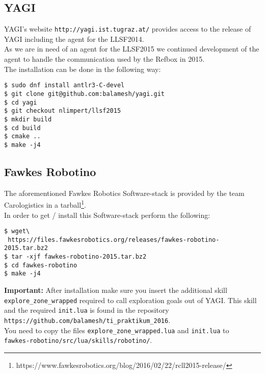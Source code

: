 \documentclass[oribibl]{llncs}
\begin{document}
\subsection{YAGI}
YAGI's website \texttt{http://yagi.ist.tugraz.at/} provides access to the release of YAGI including the agent for the LLSF2014.\\
As we are in need of an agent for the LLSF2015 we continued development of the agent to handle the communication used by the Refbox in 2015.\\
The installation can be done in the following way:
\begin{lstlisting}[frame=single]
$ sudo dnf install antlr3-C-devel
$ git clone git@github.com:balamesh/yagi.git
$ cd yagi
$ git checkout nlimpert/llsf2015
$ mkdir build
$ cd build
$ cmake ..
$ make -j4
\end{lstlisting}

\subsection{Fawkes Robotino}
The aforementioned Fawkes Robotics Software-stack is provided by the team Carologistics in a tarball\footnote{https://www.fawkesrobotics.org/blog/2016/02/22/rcll2015-release/}.\\
In order to get / install this Software-stack perform the following:
\begin{lstlisting}[frame=single]
$ wget\
 https://files.fawkesrobotics.org/releases/fawkes-robotino-2015.tar.bz2
$ tar -xjf fawkes-robotino-2015.tar.bz2
$ cd fawkes-robotino
$ make -j4
\end{lstlisting}
\textbf{Important:} After installation make sure you insert the additional skill \texttt{explore\_zone\_wrapped} required to call exploration goals out of YAGI. This skill and the required \texttt{init.lua} is found in the repository \texttt{https://github.com/balamesh/ti\_praktikum\_2016}.\\
You need to copy the files \texttt{explore\_zone\_wrapped.lua} and \texttt{init.lua} to \\\texttt{fawkes-robotino/src/lua/skills/robotino/}.
\newpage
\end{document}
